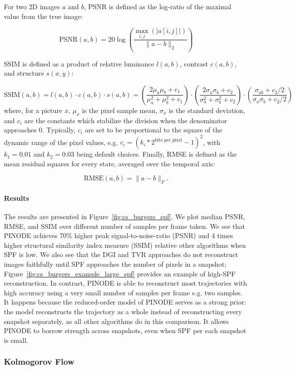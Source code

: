 For two 2D images $a$ and $b$, PSNR is defined as the log-ratio of the maximal value from the true image:

\[
	\text{PSNR}(a, b) = 20\log\left(\frac{\max_{i,j}(|a[i,j]|)}{\|a - b\|_2}\right)
\]

SSIM is defined as a product of relative luminance $l(a,b)$, contrast $c(a,b)$, and structure $s(x,y)$:

\[
	\text{SSIM}(a, b) = l(a,b) \cdot c(a,b) \cdot s(a,b) = \left(\frac{2\mu_a\mu_b + c_1}{\mu_a^2 + \mu_b^2 + c_1}\right) \cdot \left(\frac{2\sigma_a\sigma_b + c_2}{\sigma_a^2 + \sigma_b^2 + c_2} \right) \cdot \left(\frac{\sigma_{ab} + c_2/2}{\sigma_a \sigma_b + c_2/2}\right)
\]
where, for a picture $x$, $\mu_x$ is the pixel sample mean, $\sigma_x$ is the standard deviation,  and $c_i$ are the constants which stabilize the division when the denominator approaches 0. Typically, $c_i$ are set to be proportional to the square of the dynamic range of the pixel values, e.g.  $c_i = (k_i*2^{\text{bits per pixel}} - 1)^2$, with $k_1 = 0.01$ and $k_2 = 0.03$ being default choices.
Finally, RMSE is defined as the mean residual squares for every state, averaged over the temporal axis:

\[
	\text{RMSE}(a,b) = \|a - b\|_F.
\] 

\paragraph{Results} The results are presented in Figure~\ref{fig:cs_burgers_spf}. We plot median PSNR, RMSE, and SSIM over different number of samples per frame taken. We see that PINODE achieves 70\% higher peak signal-to-noise-ratio (PSNR) and 4 times higher structural similarity index measure (SSIM)  relative other algorithms when SPF is low. We also see that the DGI and TVR approaches do not reconstruct images faithfully until SPF approaches the number of pixels in a snapshot; Figure~\ref{fig:cs_burgers_example_large_spf} provides an example of high-SPF reconstruction. In contrast, PINODE is able to reconstruct most trajectories with high accuracy using a very small number of samples per frame e.g. two samples. It happens because the reduced-order model of PINODE serves as a strong prior: the model reconstructs the trajectory as a whole instead of reconstructing every snapshot separately, as all other algorithms do in this comparison. It allows PINODE to borrow strength across snapshots, even when SPF per each snapshot is small.


\subsubsection{Kolmogorov Flow}

